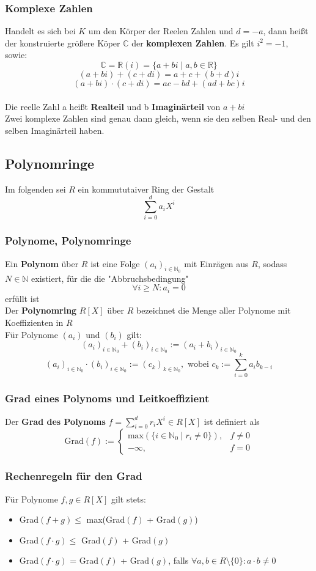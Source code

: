 \documentclass{kit}
\begin{document}
    \subsubsection{Komplexe Zahlen}
      Handelt es sich bei $K$ um den Körper der Reelen Zahlen und $d=-a$, dann heißt der konstruierte größere Köper 
      $\mathbb{C}$ der \textbf{komplexen Zahlen}. Es gilt $i^2=-1$, sowie:
      $$\mathbb{C}=\mathbb{R}(i)=\{a+bi\mid a,b\in\mathbb{R}\}$$
      $$(a+bi)+(c+di)=a+c+(b+d)i$$
      $$(a+bi)\cdot(c+di)=ac-bd+(ad+bc)i$$\\
      Die reelle Zahl a heißt \textbf{Realteil} und b \textbf{Imaginärteil} von $a+bi$\\
      Zwei komplexe Zahlen sind genau dann gleich, wenn sie den selben Real- und den selben Imaginärteil haben.
  \subsection{Polynomringe}
    Im folgenden sei $R$ ein kommututaiver Ring der Gestalt
    $$\sum_{i=0}^da_iX^i$$
    \subsubsection{Polynome, Polynomringe}
      Ein \textbf{Polynom} über $R$ ist eine Folge $(a_i)_{i\in\mathbb{N}_0}$ mit Einrägen aus $R$, 
      sodass $N\in\mathbb{N}$ existiert, für die die "Abbruchsbedingung"
      $$\forall i\ge N:a_i=0$$
      erfüllt ist\\
      Der \textbf{Polynomring} $R[X]$ über $R$ bezeichnet die Menge aller Polynome mit Koeffizienten in $R$\\
      Für Polynome $(a_i)$ und $(b_i)$ gilt:
      $$(a_i)_{i\in\mathbb{N}_0}+(b_i)_{i\in\mathbb{N}_0}:=(a_i+b_i)_{i\in\mathbb{N}_0}$$
      $$(a_i)_{i\in\mathbb{N}_0}\cdot(b_i)_{i\in\mathbb{N}_0}:=(c_k)_{k\in\mathbb{N}_0},\text{ wobei }c_k:=\sum_{i=0}^ka_ib_{k-i}$$
    \subsubsection{Grad eines Polynoms und Leitkoeffizient}
      Der \textbf{Grad des Polynoms} $f=\sum_{i=0}^dr_iX^i\in R[X]$ ist definiert als
      $$\text{Grad}(f):=\begin{cases}
        \text{max}(\{i\in\mathbb{N}_0\mid r_i\neq0\}), &f\neq0\\
        -\infty, & f=0
      \end{cases}$$
    \subsubsection{Rechenregeln für den Grad}
      Für Polynome $f,g\in R[X]$ gilt stets:
      \begin{itemize}
        \item Grad$(f+g)\le$ max(Grad$(f)$ + Grad$(g)$)
        \item Grad$(f\cdot g)\le$ Grad$(f)$ + Grad$(g)$
        \item Grad$(f\cdot g)$ = Grad$(f)$ + Grad$(g)$, falls $\forall a,b\in R\setminus\{0\}:a\cdot b\neq0$
      \end{itemize}
\end{document}

